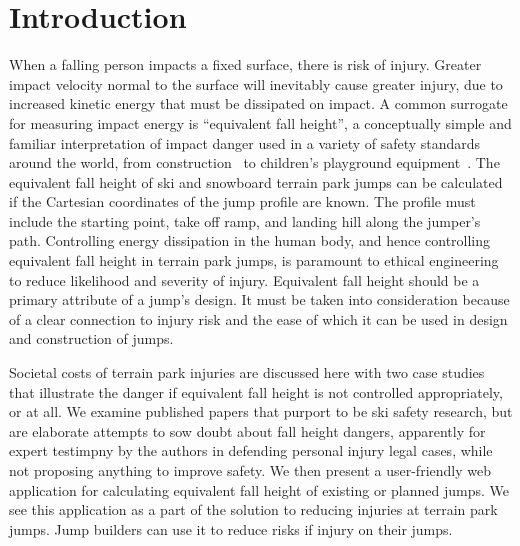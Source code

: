 \documentclass[smallextended]{svjour3}       %
\begin{document}
\section{Introduction}
\label{intro}
%
When a falling person impacts a fixed surface, there is risk of injury. Greater
impact velocity normal to the surface will inevitably cause greater injury, due
to increased kinetic energy that must be dissipated on impact. A common
surrogate for measuring impact energy is ``equivalent fall height'', a
conceptually simple and familiar interpretation of impact danger used in a
variety of safety standards around the world, from construction~\cite{OSHA2021}
to children's playground equipment~\cite{Chalmers1996}. The equivalent fall
height of ski and snowboard terrain park jumps can be
calculated~\cite{McNeil2012} if the Cartesian coordinates of the jump profile
are known. The profile must include the starting point, take off ramp, and landing hill along
the jumper's path. Controlling energy dissipation in the human body, and hence
controlling equivalent fall height in terrain park jumps, is paramount to ethical engineering to reduce likelihood and severity of injury. Equivalent fall
height should be a primary attribute of a jump's design. It must be taken into
consideration because of a clear connection to injury risk and the ease of
which it can be used in design and construction of jumps.

Societal costs of terrain park injuries are discussed here with two case studies that illustrate the danger if equivalent fall
height is not controlled appropriately, or at all. We examine published papers
that purport to be ski safety research, but are elaborate attempts to sow doubt about fall height dangers, apparently for expert testimpny by the authors in defending personal injury legal cases, while not proposing anything to improve safety. We then present a user-friendly web application for
calculating equivalent fall height of existing or planned jumps. We see this
application as a part of the solution to reducing injuries at terrain park
jumps. Jump builders can use it to reduce risks if injury on their jumps.
\end{document}
